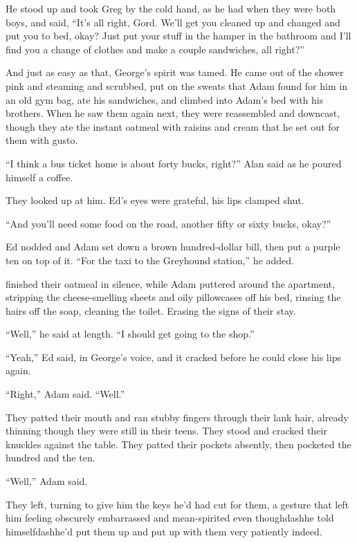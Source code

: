 He stood up and took Greg by the cold hand, as he had when they were
both boys, and said, ``It's all right, Gord.  We'll get you cleaned up
and changed and put you to bed, okay?  Just put your stuff in the
hamper in the bathroom and I'll find you a change of clothes and make
a couple sandwiches, all right?''

And just as easy as that, George's spirit was tamed.  He came out of
the shower pink and steaming and scrubbed, put on the sweats that Adam
found for him in an old gym bag, ate his sandwiches, and climbed into
Adam's bed with his brothers.  When he saw them again next, they were
reassembled and downcast, though they ate the instant oatmeal with
raisins and cream that he set out for them with gusto.

``I think a bus ticket home is about forty bucks, right?'' Alan said
as he poured himself a coffee.

They looked up at him.  Ed's eyes were grateful, his lips clamped
shut.

``And you'll need some food on the road, another fifty or sixty bucks,
okay?''

Ed nodded and Adam set down a brown hundred-dollar bill, then put a
purple ten on top of it.  ``For the taxi to the Greyhound station,''
he added.

 finished their oatmeal in silence, while Adam puttered around the
apartment, stripping the cheese-smelling sheets and oily pillowcases
off his bed, rinsing the hairs off the soap, cleaning the toilet. 
Erasing the signs of their stay.

``Well,'' he said at length.  ``I should get going to the shop.''

``Yeah,'' Ed said, in George's voice, and it cracked before he could
close his lips again.

``Right,'' Adam said.  ``Well.''

They patted their mouth and ran stubby fingers through their lank
hair, already thinning though they were still in their teens.  They
stood and cracked their knuckles against the table.  They patted their
pockets absently, then pocketed the hundred and the ten.

``Well,'' Adam said.

They left, turning to give him the keys he'd had cut for them, a
gesture that left him feeling obscurely embarrassed and mean-spirited
even thoughdash{}he told himselfdash{}he'd put them up and put up with them
very patiently indeed.

